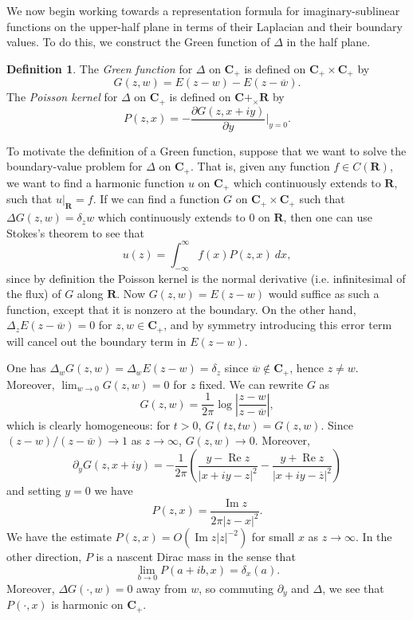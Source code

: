 \documentclass[12pt]{report}
\newcommand{\RR}{\mathbf{R}}
\newcommand{\CC}{\mathbf{C}}
\newcommand{\dfn}[1]{\emph{#1}\index{#1}}
\renewcommand{\Re}{\operatorname{Re}}
\renewcommand{\Im}{\operatorname{Im}}
\theoremstyle{definition}
\newtheorem{definition}[theorem]{Definition}
\theoremstyle{remark}
\begin{document}
We now begin working towards a representation formula for imaginary-sublinear functions on the upper-half plane in terms of their Laplacian and their boundary values. To do this, we construct the Green function of $\Delta$ in the half plane.
\begin{definition}
    The \dfn{Green function} for $\Delta$ on $\CC_+$ is defined on $\CC_+ \times \CC_+$ by
$$G(z, w) = E(z - w) - E(z - \overline w).$$
    The \dfn{Poisson kernel} for $\Delta$ on $\CC_+$ is defined on $\CC+_ \times \RR$ by
$$P(z, x) = -\frac{\partial G(z, x + iy)}{\partial y}|_{y = 0}.$$
\end{definition}
  To motivate the definition of a Green function, suppose that we want to solve the boundary-value problem for $\Delta$ on $\CC_+$. That is, given any function $f \in C(\RR)$, we want to find a harmonic function $u$ on $\CC_+$ which continuously extends to $\RR$, such that $u|_\RR = f$. If we can find a function $G$ on $\CC_+ \times \CC_+$ such that $\Delta G(z, w) = \delta_z w$ which continuously extends to $0$ on $\RR$, then one can use Stokes's theorem to see that
$$u(z) = \int_{-\infty}^\infty f(x) P(z, x) ~dx,$$
  since by definition the Poisson kernel is the normal derivative (i.e. infinitesimal of the flux) of $G$ along $\RR$. Now $G(z, w) = E(z - w)$ would suffice as such a function, except that it is nonzero at the boundary. On the other hand, $\Delta_z E(z - \overline w) = 0$ for $z, w \in \CC_+$, and by symmetry introducing this error term will cancel out the boundary term in $E(z - w)$.

    One has $\Delta_w G(z, w) = \Delta_w E(z - w) = \delta_z$ since $\overline w \notin \CC_+$, hence $z \neq w$. Moreover, $\lim_{w \to 0} G(z, w) = 0$ for $z$ fixed. We can rewrite $G$ as
$$G(z, w) = \frac{1}{2\pi} \log\left|\frac{z - w}{z - \overline w}\right|,$$
    which is clearly homogeneous: for $t > 0$, $G(tz, tw) = G(z, w)$. Since $(z-w)/(z - \overline w) \to 1$ as $z \to \infty$, $G(z, w) \to 0$.  Moreover,
$$\partial_y G(z, x + iy) = -\frac{1}{2\pi} \left(\frac{y - \Re z}{|x + iy - z|^2} - \frac{y + \Re z}{|x + iy - \overline z|^2}\right)$$
  and setting $y = 0$ we have
$$P(z, x) = \frac{\Im z}{2\pi|z-x|^2}.$$
We have the estimate $P(z, x) = O(\Im z|z|^{-2})$ for small $x$ as $z \to \infty$. In the other direction, $P$ is a nascent Dirac mass in the sense that
$$\lim_{b \to 0} P(a + ib, x) = \delta_x(a).$$ Moreover, $\Delta G(\cdot, w) = 0$ away from $w$, so commuting $\partial_y$ and $\Delta$, we see that $P(\cdot, x)$ is harmonic on $\CC_+$.
\end{document}
